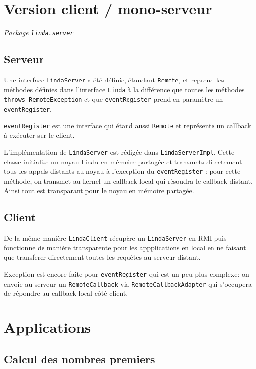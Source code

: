 \documentclass[headings=standardclasses,parskip=half]{scrartcl}
\begin{document}
\section{Version client / mono-serveur}

\textit{Package \texttt{linda.server}}

\subsection{Serveur}

Une interface \texttt{LindaServer} a été définie, étandant \texttt{Remote},
et reprend les méthodes définies dans l'interface \texttt{Linda} à la
différence que toutes les méthodes \texttt{throws RemoteException} et
que \texttt{eventRegister} prend en paramètre un \texttt{eventRegister}.

\texttt{eventRegister} est une interface qui étand aussi \texttt{Remote}
et représente un callback à exécuter sur le client.

L'implémentation de \texttt{LindaServer} est rédigée dans
\texttt{LindaServerImpl}. Cette classe initialise un noyau Linda en
mémoire partagée et transmets directement tous les appels distants au
noyau à l'exception du \texttt{eventRegister} : pour cette méthode,
on transmet au kernel un callback local qui résoudra le callback distant.
Ainsi tout est transparant pour le noyau en mémoire partagée.

\subsection{Client}

De la même manière \texttt{LindaClient} récupère un \texttt{LindaServer}
en RMI puis fonctionne de manière transparente pour les appplications en
local en ne faisant que transferer directement toutes les requêtes au
serveur distant.

Exception est encore faite pour \texttt{eventRegister} qui est un peu plus
complexe: on envoie au serveur un \texttt{RemoteCallback} via
\texttt{RemoteCallbackAdapter} qui s'occupera de répondre au callback
local côté client.

\section{Applications}

\subsection{Calcul des nombres premiers}
\end{document}
